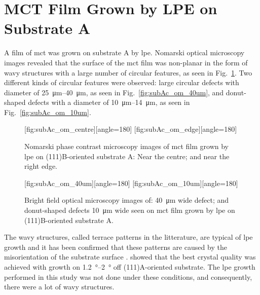 \clearpage
\section{MCT Film Grown by LPE on Substrate A}\label{sec:subAc}

A film of \acl{mct} was grown on substrate A by \ac{lpe}. Nomarski optical microscopy images revealed that the surface of the \ac{mct} film was non-planar in the form of wavy structures with a large number of circular features, as seen in Fig.~\ref{fig:subAc_om}. Two different kinds of circular features were observed: large circular defects with diameter of \SIrange{25}{40}{\micro\metre}, as seen in Fig.~\ref{fig:subAc_om_40um}, and donut-shaped defects with a diameter of \SIrange{10}{14}{\micro\metre}, as seen in Fig.~\ref{fig:subAc_om_10um}. %

\begin{figure}[htbp]
    \centering
    [fig:subAc_om_centre][angle=180]
    \hfill
    [fig:subAc_om_edge][angle=180]
    \caption[Nomarski phase contrast microscopy images of \ac{mct} film grown by \ac{lpe} on substrate A.]{Nomarski phase contrast microscopy images of \ac{mct} film grown by \ac{lpe} on (111)B-oriented substrate A:  Near the centre; and  near the right edge.}
    \label{fig:subAc_om}
\end{figure}

\begin{figure}[htbp]
    \centering
    [fig:subAc_om_40um][angle=180]
    \hfill
    [fig:subAc_om_10um][angle=180]
    \caption[Bright field optical microscopy images of defects seen on \ac{mct} film grown by \ac{lpe} on substrate A.]{Bright field optical microscopy images of:  \SI{40}{\micro\metre} wide defect; and  donut-shaped defects \SI{10}{\micro\metre} wide seen on \ac{mct} film grown by \ac{lpe} on (111)B-oriented substrate A.}
    \label{fig:subAc_om_40umand10um}
\end{figure}

The wavy structures, called terrace patterns in the litterature, are typical of \ac{lpe} growth and it has been confirmed that these patterns are caused by the misorientation of the substrate surface \citep{benz1980crystals, parker1988terracing}. \citet{li1998crystallinity} showed that the best crystal quality was achieved with growth on \SIrange{1.2}{2}{\degree} off (111)A-oriented substrate. The \ac{lpe} growth performed in this study was not done under these conditions, and consequently, there were a lot of wavy structures.

